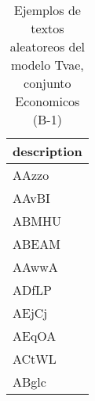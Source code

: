 \begin{table}[H]
\centering
\fontsize{8}{14}\selectfont
\caption{Ejemplos de textos aleatoreos del modelo Tvae, conjunto Economicos (B-1)}
\label{table-sample10-economicos-b-1-tvae-text}
\begin{tabular}{|m{50em}|}
\hline
\rowcolor[gray]{0.8}
description \\
\hline AAzzo \\
\hline AAvBI \\
\hline ABMHU \\
\hline ABEAM \\
\hline AAwwA \\
\hline ADfLP \\
\hline AEjCj \\
\hline AEqOA \\
\hline ACtWL \\
\hline ABglc \\
\hline
\end{tabular}
\end{table}
